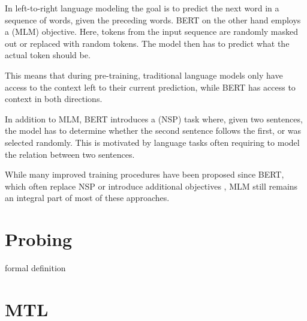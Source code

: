 In left-to-right language modeling the goal is to predict the next word in a sequence of words, given the preceding words. BERT on the other hand employs a  (MLM) objective. Here, tokens from the input sequence are randomly masked out or replaced with random tokens. The model then has to predict what the actual token should be.

This means that during pre-training, traditional language models only have access to the context left to their current prediction, while BERT has access to context in both directions.

In addition to MLM, BERT introduces a  (NSP) task where, given two sentences, the model has to determine whether the second sentence follows the first, or was selected randomly. This is motivated by language tasks often requiring to model the relation between two sentences.

While many improved training procedures have been proposed since BERT, which often replace NSP or introduce additional objectives \cite{DBLP:journals/corr/abs-2003-10555, DBLP:journals/corr/abs-1907-11692, 10.5555/3454287.3454804, Lan2020ALBERT}, MLM still remains an integral part of most of these approaches.

\section{Probing}
formal definition
\section{MTL}